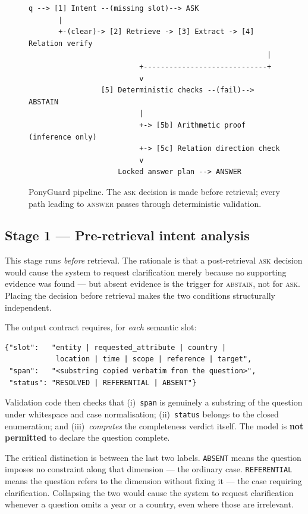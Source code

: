 \documentclass[conference]{IEEEtran}
\newcommand{\ACT}[1]{\textsc{#1}}
\begin{document}
\begin{figure}[t]
\centering
\begin{lstlisting}[style=contract]
q --> [1] Intent --(missing slot)--> ASK
       |
       +-(clear)-> [2] Retrieve -> [3] Extract -> [4] Relation verify
                                                        |
                          +-----------------------------+
                          v
                 [5] Deterministic checks --(fail)--> ABSTAIN
                          |
                          +-> [5b] Arithmetic proof (inference only)
                          +-> [5c] Relation direction check
                          v
                     Locked answer plan --> ANSWER
\end{lstlisting}
\caption{PonyGuard pipeline. The \ACT{ask} decision is made before retrieval;
every path leading to \ACT{answer} passes through deterministic validation.}
\label{fig:pipeline}
\end{figure}

\subsection{Stage 1 --- Pre-retrieval intent analysis}
\label{sec:intent}

This stage runs \emph{before} retrieval. The rationale is that a post-retrieval
\ACT{ask} decision would cause the system to request clarification merely because
no supporting evidence was found --- but absent evidence is the trigger for
\ACT{abstain}, not for \ACT{ask}. Placing the decision before retrieval makes the
two conditions structurally independent.

The output contract requires, for \emph{each} semantic slot:

\begin{lstlisting}[style=contract]
{"slot":   "entity | requested_attribute | country |
            location | time | scope | reference | target",
 "span":   "<substring copied verbatim from the question>",
 "status": "RESOLVED | REFERENTIAL | ABSENT"}
\end{lstlisting}

Validation code then checks that (i)~\texttt{span} is genuinely a substring of the
question under whitespace and case normalisation; (ii)~\texttt{status} belongs to
the closed enumeration; and (iii)~\emph{computes} the completeness verdict itself.
The model is \textbf{not permitted} to declare the question complete.

The critical distinction is between the last two labels. \texttt{ABSENT} means the
question imposes no constraint along that dimension --- the ordinary case.
\texttt{REFERENTIAL} means the question refers to the dimension without fixing it
--- the case requiring clarification. Collapsing the two would cause the system to
request clarification whenever a question omits a year or a country, even where
those are irrelevant.
\end{document}

